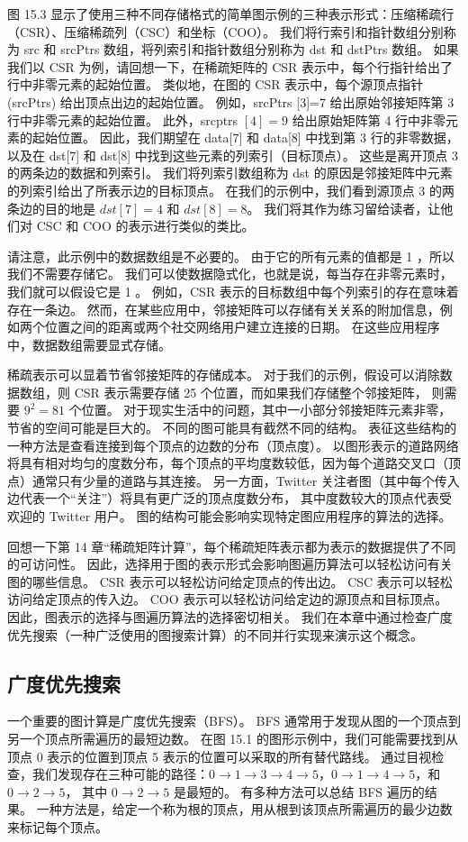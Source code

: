 图 15.3 显示了使用三种不同存储格式的简单图示例的三种表示形式：压缩稀疏行（CSR）、压缩稀疏列（CSC）和坐标（COO）。 
我们将行索引和指针数组分别称为 src 和 srcPtrs 数组，将列索引和指针数组分别称为 dst 和 dstPtrs 数组。 
如果我们以 CSR 为例，请回想一下，在稀疏矩阵的 CSR 表示中，每个行指针给出了行中非零元素的起始位置。 
类似地，在图的 CSR 表示中，每个源顶点指针 (srcPtrs) 给出顶点出边的起始位置。 
例如，srcPtrs [3]=7 给出原始邻接矩阵第 3 行中非零元素的起始位置。 
此外，srcptrs $[4]=9$ 给出原始矩阵第 4 行中非零元素的起始位置。 
因此，我们期望在 data[7] 和 data[8] 中找到第 3 行的非零数据，
以及在 dst[7] 和 dst[8] 中找到这些元素的列索引（目标顶点）。 这些是离开顶点 3 的两条边的数据和列索引。 
我们将列索引数组称为 dst 的原因是邻接矩阵中元素的列索引给出了所表示边的目标顶点。 
在我们的示例中，我们看到源顶点 3 的两条边的目的地是 $d s t[7]=4$ 和 $d s t[8]=8$。 
我们将其作为练习留给读者，让他们对 CSC 和 COO 的表示进行类似的类比。

请注意，此示例中的数据数组是不必要的。 由于它的所有元素的值都是 1 ，所以我们不需要存储它。 
我们可以使数据隐式化，也就是说，每当存在非零元素时，我们就可以假设它是 1 。 
例如，CSR 表示的目标数组中每个列索引的存在意味着存在一条边。 
然而，在某些应用中，邻接矩阵可以存储有关关系的附加信息，例如两个位置之间的距离或两个社交网络用户建立连接的日期。 
在这些应用程序中，数据数组需要显式存储。

稀疏表示可以显着节省邻接矩阵的存储成本。 
对于我们的示例，假设可以消除数据数组，则 CSR 表示需要存储 25 个位置，而如果我们存储整个邻接矩阵，
则需要 $9^{2}=81$ 个位置。 对于现实生活中的问题，其中一小部分邻接矩阵元素非零，节省的空间可能是巨大的。 
不同的图可能具有截然不同的结构。 表征这些结构的一种方法是查看连接到每个顶点的边数的分布（顶点度）。 
以图形表示的道路网络将具有相对均匀的度数分布，每个顶点的平均度数较低，因为每个道路交叉口（顶点）通常只有少量的道路与其连接。 
另一方面，Twitter 关注者图（其中每个传入边代表一个“关注”）将具有更广泛的顶点度数分布，
其中度数较大的顶点代表受欢迎的 Twitter 用户。 图的结构可能会影响实现特定图应用程序的算法的选择。

回想一下第 14 章“稀疏矩阵计算”，每个稀疏矩阵表示都为表示的数据提供了不同的可访问性。 
因此，选择用于图的表示形式会影响图遍历算法可以轻松访问有关图的哪些信息。 CSR 表示可以轻松访问给定顶点的传出边。 
CSC 表示可以轻松访问给定顶点的传入边。 $\mathrm{COO}$ 表示可以轻松访问给定边的源顶点和目标顶点。 
因此，图表示的选择与图遍历算法的选择密切相关。 
我们在本章中通过检查广度优先搜索（一种广泛使用的图搜索计算）的不同并行实现来演示这个概念。

\subsection{广度优先搜索}
一个重要的图计算是广度优先搜索（BFS）。 BFS 通常用于发现从图的一个顶点到另一个顶点所需遍历的最短边数。 
在图 15.1 的图形示例中，我们可能需要找到从顶点 0 表示的位置到顶点 5 表示的位置可以采取的所有替代路线。 
通过目视检查，我们发现存在三种可能的路径：$0 \rightarrow 1 \rightarrow 3 \rightarrow 4 \rightarrow 5，0 \rightarrow 1 \rightarrow 4 \rightarrow 5$，和 $0 \rightarrow 2 \rightarrow 5$，
其中 $0 \rightarrow 2 \rightarrow 5$ 是最短的。 有多种方法可以总结 BFS 遍历的结果。 
一种方法是，给定一个称为根的顶点，用从根到该顶点所需遍历的最少边数来标记每个顶点。

